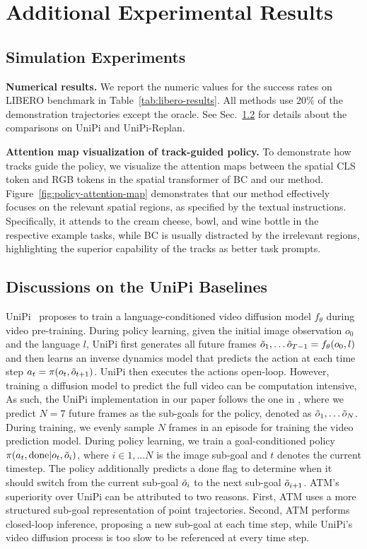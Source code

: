 \clearpage
\appendices
\section{Additional Experimental Results}

\subsection{Simulation Experiments}

\noindent\textbf{Numerical results.} We report the numeric values for the success rates on LIBERO benchmark in Table~\ref{tab:libero-results}. All methods use 20$\%$ of the demonstration trajectories except the oracle. See Sec.~\ref{sec:app:unipi} for details about the comparisons on UniPi and UniPi-Replan.

\noindent\textbf{Attention map visualization of track-guided policy.}
To demonstrate how tracks guide the policy, we visualize the attention maps between the spatial CLS token and RGB tokens in the spatial transformer of BC and our method. Figure~\ref{fig:policy-attention-map} demonstrates that our method effectively focuses on the relevant spatial regions, as specified by the textual instructions. Specifically, it attends to the cream cheese, bowl, and wine bottle in the respective example tasks, while BC is usually distracted by the irrelevant regions, highlighting the superior capability of the tracks as better task prompts.


\subsection{Discussions on the UniPi Baselines}\label{sec:app:unipi}

UniPi~\cite{du2023unipi} proposes to train a language-conditioned video diffusion model $f_\theta$ during video pre-training. During policy learning, given the initial image observation $o_0$ and the language $l$, UniPi first generates all future frames $\Tilde{o}_1, \dots \Tilde{o}_{T-1} = f_\theta (o_0, l)$ and then learns an inverse dynamics model that predicts the action at each time step $a_t = \pi(o_t, \Tilde{o}_{t+1})$. UniPi then executes the actions open-loop. However, training a diffusion model to predict the full video can be computation intensive, As such, the UniPi implementation in our paper follows the one in \citet{Ko2023Learning}, where we predict $N=7$ future frames as the sub-goals for the policy, denoted as $\Tilde{o}_1, \dots \Tilde{o}_N$. During training, we evenly sample $N$ frames in an episode for training the video prediction model. During policy learning, we train a goal-conditioned policy $\pi(a_t, \text{done} | o_t, \Tilde{o}_{i})$, where $i\in {1, \dots N}$ is the image sub-goal and $t$ denotes the current timestep. The policy additionally predicts a done flag to determine when it should switch from the current sub-goal $\Tilde{o}_i$ to the next sub-goal $\Tilde{o}_{i+1}$. ATM's superiority over UniPi can be attributed to two reasons. First, ATM uses a more structured sub-goal representation of point trajectories. Second, ATM performs closed-loop inference, proposing a new sub-goal at each time step, while UniPi's video diffusion process is too slow to be referenced at every time step. 

